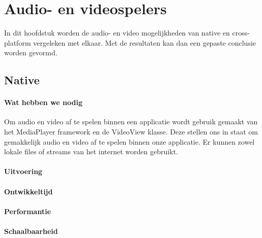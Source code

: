 
\chapter{Audio- en videospelers}%
\label{ch:audioenvideo}

In dit hoofdstuk worden de audio- en video mogelijkheden van native en cross-platform vergeleken met elkaar. 
Met de resultaten kan dan een gepaste conclusie worden gevormd.

\section{Native}
\subsubsection{Wat hebben we nodig}
Om audio en video af te spelen binnen een applicatie wordt gebruik gemaakt van het MediaPlayer 
framework en de VideoView klasse. Deze stellen ons in staat om gemakkelijk audio en video af te spelen binnen 
onze applicatie. Er kunnen zowel lokale files of streams van het internet worden gebruikt.

\subsubsection{Uitvoering}



\subsubsection{Ontwikkeltijd}



\subsubsection{Performantie}



\subsubsection{Schaalbaarheid}




